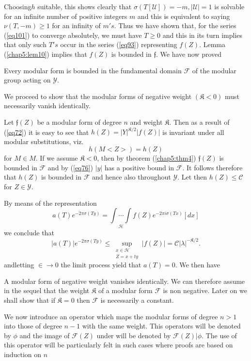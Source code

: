 Choosing\pageoriginale $h$ suitable, this shows clearly that $\sigma (T
[\mathcal{U}])=-m,|\mathcal{U}|=1$ is solvable for an infinite number
of positive integers $m$ and this is equivalent to saying $\nu
(T,-m)\ge 1$ for an infinity of $m's$. Thus we have shown
that, for the series (\ref{eq101}) to converge absolutely, we must have $T
\ge 0$ and this in its turn implies that only such $T's$
occur in the series (\ref{eq93}) representing $f(Z)$. Lemma
(\ref{chap5:lem10}) implies that $f(Z)$ is bounded in
$\mathfrak{f}$. We have now proved  

\setcounter{thm}{3}
\begin{thm}\label{chap5:thm4}%
 Every modular form is bounded in the fundamental domain $\mathcal{F}$ of
  the modular group acting on $\mathscr{Y}$. 
\end{thm}

We proceed to show that the modular forms of negative weight
$(\mathfrak{K}<0)$ must necessarily vanish identically. 

Let $\mathfrak{f}(Z)$ be a modular form of degree $n$ and weight
$\mathfrak{K}$. Then as a result of (\ref{eq72}) it is easy to see that
$h(Z)=|Y|^{\mathfrak{K}/2}|f(Z)|$ is invariant under all modular
substitutions, viz. 
\begin{equation*}
h (M< Z >)=h(Z) \tag{101}\label{eq101}
\end{equation*}
for $M \in M$. If we assume $\mathfrak{K}<0$, then by theorem
(\ref{chap5:thm4}) $ \mathfrak{f}(Z)$ 
is bounded in $\mathcal{F}$ and by (\ref{eq76}) $|y|$ has a positive bound in
$\mathcal{F}$. It follows therefore that $h(Z)$ is bounded in
$\mathcal{F}$ and hence also throughout $\mathscr{Y}$. Let then
$h(Z)\le \mathscr{C}$ for $Z \in \mathscr{Y}$.  

By means of the representation
$$
a (T)e^{-2 \pi \sigma (Ty)}= \underset {\mathscr{H}}{\int \cdots
  \int} f(Z)e^{-2 \pi i \sigma (Tx)}[dx] 
$$
we conclude that
$$
|a (T)|e^{-2 \pi \sigma (Ty)} \le \sup _{\substack{x \in
    \mathscr{H}\\{Z=x+ty}}}| f (Z)|=
\mathscr{C}|\lambda|^{-\mathfrak{K}/2}. 
$$
and\pageoriginale letting $\in \to 0$ the limit process yield that $a
(T)=0$. We then have 

\begin{thm}%
 A modular form of negative weight vanishes identically. We can
therefore assume in the sequel that the weight $\mathfrak{K}$ of a
modular form $\mathscr{F}$ is non negative. Later on we shall show that
if $\mathfrak{K}=0$ then $\mathscr{F}$ is necessarily a constant. 

We now introduce an operator which maps the modular forms of degree
$n > 1$ into those of degree $n-1$ with the same weight. This
operators will be denoted by $\phi$ and the image of
$\mathscr{F}(Z)$ under will be denoted by $\mathscr{F}(Z)| \phi$. The
use of this operator will be particularly felt in such cases where
proofs are based on induction on $n$ 
\end{thm}

